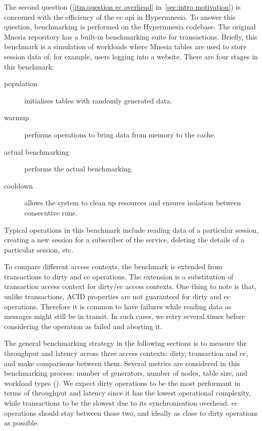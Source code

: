 The second question (\cref{itm:question ec overhead} in~\cref{sec:intro motivation}) 
is concerned with the efficiency of the \acrlong{ec} \acrshort{api} in Hypermnesia. 
To answer this question, benchmarking is performed on the Hypermnesia codebase.
The original Mnesia repository has a built-in benchmarking suite for transactions. 
Briefly, this benchmark is a
simulation of workloads where Mnesia tables are used to store session data of,
for example, users logging into a website. There are four stages in this benchmark:

\begin{description}
  \item[population] initialises tables with randomly generated data.
  \item[warmup] performs operations to bring data from memory to the cache.
  \item[actual benchmarking] performs the actual benchmarking.
  \item[cooldown] allows the system to clean up resources and ensures isolation
  between consecutive runs.
\end{description}

Typical operations in this benchmark include reading
data of a particular session, creating a new session for a subscriber of
the service, deleting the details of a particular session, etc.

To compare different access contexts, the benchmark is extended from transactions 
to dirty and \acrshort{ec} operations. The extension is a substitution of transaction
access context for dirty/\acrshort{ec} access contexts. One thing to note is that,
unlike transactions, ACID properties are not guaranteed for dirty and \acrshort{ec}
operations. Therefore it is common
to have failures while reading data as messages might still be in transit. 
In such cases, we retry several times before considering the operation
as failed and aborting it.

The general benchmarking strategy in the following sections is to measure 
the throughput and latency across three access contexts: dirty, transaction 
and \acrshort{ec}, and make comparisons between them. Several metrics are 
considered in this benchmarking process: number of generators, 
number of nodes, table size, and workload types 
().
We expect dirty operations to be the most performant in terms of throughput and 
latency since it has the lowest 
operational complexity, while transactions to be the slowest
due to its synchronisation overhead. \acrshort{ec} operations should stay
between those two, and ideally as close to dirty operations as possible.

